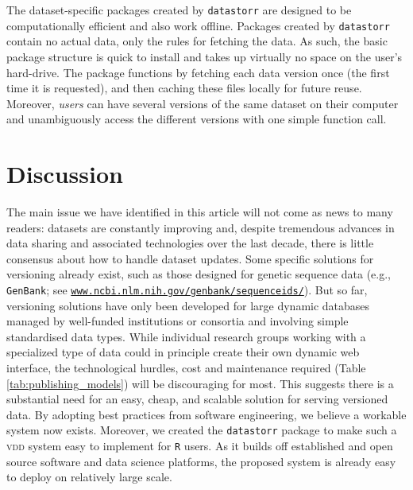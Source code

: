 \documentclass[english]{article}
\newcommand{\smurl}[1]{{\footnotesize\href{https://#1}{\nolinkurl{#1}}}}
\begin{document}
The dataset-specific packages created by \texttt{datastorr} are designed to be computationally efficient and also work offline. Packages created by \texttt{datastorr} contain no actual data, only the rules for fetching the data. As such, the basic package structure is quick to install and takes up virtually no space on the user's hard-drive. The package functions by fetching each data version once (the first time it is requested), and then caching these files locally for future reuse. Moreover, \emph{users} can have several versions of the same dataset on their computer and unambiguously access the different versions with one simple function call.

\section*{Discussion}

The main issue we have identified in this article will not come as news to many readers: datasets are constantly improving and, despite tremendous advances in data sharing and associated technologies over the last decade, there is little consensus about how to handle dataset updates. Some specific solutions for versioning already exist, such as those designed for genetic sequence data (e.g., \texttt{GenBank}; see \smurl{www.ncbi.nlm.nih.gov/genbank/sequenceids/}). But so far, versioning solutions have only been developed for large dynamic databases managed by well-funded institutions or consortia and involving simple standardised data types. While individual research groups working with a specialized type of data could in principle create their own dynamic web interface, the technological hurdles, cost and maintenance required (Table \ref{tab:publishing_models}) will be discouraging for most. This suggests there is a substantial need for an easy, cheap, and scalable solution for serving versioned data. By adopting best practices from software engineering, we believe a workable system now exists. Moreover, we created the \texttt{datastorr} package to make such a \textsc{vdd} system easy to implement for \texttt{R} users. As it builds off established and open source software and data science platforms, the proposed system is already easy to deploy on relatively large scale.
\end{document}
